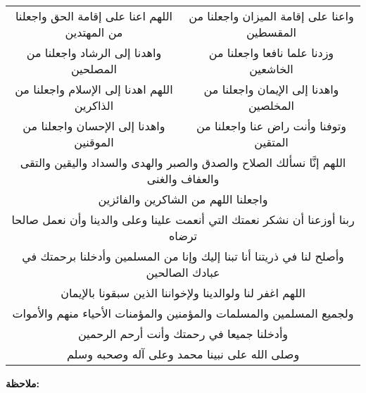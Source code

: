 \begin{center}
\begin{tabular}{cc}
    اللهم اعنا على إقامة الحق واجعلنا من المهتدين & 
    واعنا على إقامة الميزان واجعلنا من المقسطين  \\
    واهدنا إلى الرشاد واجعلنا من المصلحين & 
    وزدنا علما نافعا واجعلنا من الخاشعين \\
    اللهم اهدنا إلى الإسلام واجعلنا من الذاكرين & 
    واهدنا إلى الإيمان واجعلنا من المخلصين \\
    واهدنا إلى الإحسان واجعلنا من الموقنين & 
    وتوفنا وأنت راض عنا واجعلنا من المتقين \\
    \multicolumn{2}{c}{اللهم إنَّا نسألك الصلاح والصدق والصبر والهدى والسداد  واليقين والتقى والعفاف والغنى} \\
    \multicolumn{2}{c}{واجعلنا اللهم من الشاكرين والفائزين} \\
    \multicolumn{2}{c}{ربنا أوزعنا أن نشكر نعمتك التي أنعمت علينا وعلى والدينا وأن نعمل صالحا ترضاه} \\
    \multicolumn{2}{c}{وأصلح لنا في ذريتنا أنا تبنا إليك وإنا من المسلمين وأدخلنا برحمتك في عبادك الصالحين} \\
    \multicolumn{2}{c}{اللهم اغفر لنا ولوالدينا ولإخواننا الذين سبقونا بالإيمان} \\
    \multicolumn{2}{c}{ولجميع المسلمين والمسلمات والمؤمنين والمؤمنات الأحياء منهم والأموات} \\
    \multicolumn{2}{c}{وأدخلنا جميعا في رحمتك وأنت أرحم الرحمين} \\
    \multicolumn{2}{c}{وصلى الله على نبينا محمد وعلى آله وصحبه وسلم} \\
\end{tabular}
\end{center}

\newpage
\vspace*{\fill}
\textbf{ملاحظة:}

